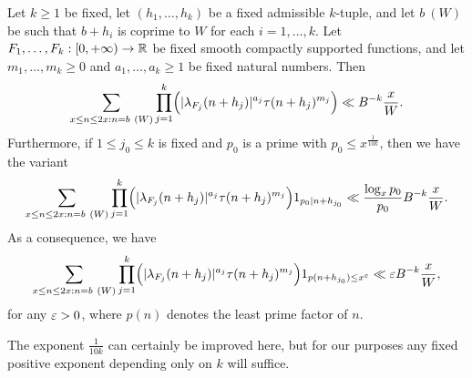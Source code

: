 \begin{proposition}\label{almostprime} Let $k \geq 1$ be fixed, let $(h_1,\dots,h_k)$ be a fixed admissible $k$-tuple, and let $b\ (W)$ be such that $b+h_i$ is coprime to $W$ for each $i=1,\dots,k$.  Let $F_1,\dots,F_k: [0,+\infty) \to \mathbb{R}$ be fixed smooth compactly supported functions, and let $m_1,\dots,m_k \geq 0$ and $a_1,\dots,a_k \geq 1$ be fixed natural numbers.  Then
\begin{equation}\label{lambdatau}
\sum_{x \leq n \leq 2x: n = b\ (W)} \prod_{j=1}^k \Bigl(|\lambda_{F_j}(n+h_j)|^{a_j} \tau(n+h_j)^{m_j}\Bigr) \ll B^{-k} \frac{x}{W}.
\end{equation}
Furthermore, if $1 \leq j_0 \leq k$ is fixed and $p_0$ is a prime with $p_0 \leq x^{\frac{1}{10k}}$, then we have the variant
\begin{equation}\label{lambdatau-fix}
\sum_{x \leq n \leq 2x: n = b\ (W)} \prod_{j=1}^k \Bigl(|\lambda_{F_j}(n+h_j)|^{a_j} \tau(n+h_j)^{m_j}\Bigr) 1_{p_0|n+h_{j_0}} \ll \frac{\log_x p_0}{p_0} B^{-k} \frac{x}{W}.
\end{equation}
As a consequence, we have
\begin{equation}\label{lambdatau-fix2}
\sum_{x \leq n \leq 2x: n = b\ (W)} \prod_{j=1}^k \Bigl(|\lambda_{F_j}(n+h_j)|^{a_j} \tau(n+h_j)^{m_j}\Bigr) 1_{p(n+h_{j_0}) \leq x^\varepsilon} \ll \varepsilon B^{-k} \frac{x}{W},
\end{equation}
for any $\varepsilon > 0$, where $p(n)$ denotes the least prime factor of $n$.
\end{proposition}

The exponent $\frac{1}{10k}$ can certainly be improved here, but for our purposes any fixed positive exponent depending only on $k$ will suffice.

